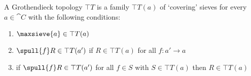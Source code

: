 \begin{definition}

A Grothendieck topology $\top{T}$ is a family $\top{T}(a)$ 
of `covering' sieves for every $a\in \cat{C}$ with the following conditions:

\begin{enumerate}
\item  $\maxsieve{a} \in \top{T}(a)$
\item $\spull{f}R\in \top{T}(a')$ if $R\in \top{T}(a)$ 
		for all $f:a'\rightarrow a$
\item if $\spull{f}R\in \top{T}(a')$ for all $f\in S$ 
		with $S\in \top{T}(a)$ then $R\in \top{T}(a)$
\end{enumerate}

\end{definition}

